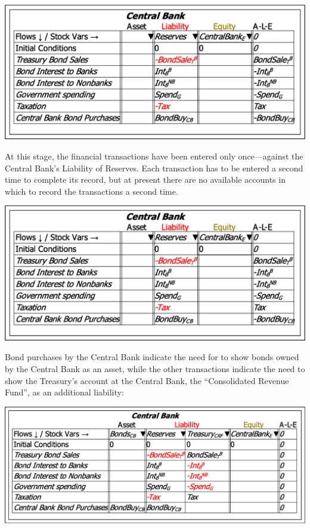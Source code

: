 \includegraphics{images/GodleyTableSecondIncomplete}

At this stage, the financial transactions have been entered only once---against
the Central Bank's Liability of Reserves. Each transaction has to
be entered a second time to complete its record, but at present there
are no available accounts in which to record the transactions a second
time.

\includegraphics{images/GodleyTableSecondIncomplete}

Bond purchases by the Central Bank indicate the need for to show bonds
owned by the Central Bank as an asset, while the other transactions
indicate the need to show the Treasury's account at the Central Bank,
the ``Consolidated Revenue Fund'', as an additional liability:

\includegraphics{images/GodleyTableSecondComplete}

